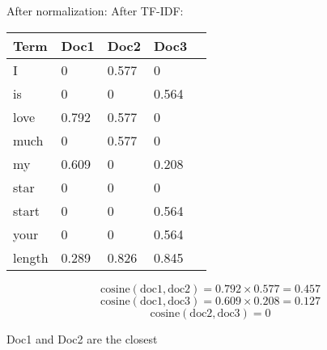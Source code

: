 \documentclass[11pt,a4paper]{report}
\begin{document}
\begin{multicols*}{2}
\noindent After normalization:
\noindent After TF-IDF:
\begin{center}
\begin{tabular}{ | l | l l l |l|} 
    \hline
    Term   & Doc1 & Doc2 & Doc3 \\
    \hline
    I      &0     &0.577 &0     \\
    is     &0     &0     &0.564 \\
    love   &0.792 &0.577 &0     \\
    much   &0     &0.577 &0     \\
    my     &0.609 &0     &0.208 \\
    star   &0     &0     &0     \\
    start  &0     &0     &0.564 \\
    your   &0     &0     &0.564 \\
    \hline
    length &0.289 &0.826 &0.845 \\
    \hline
\end{tabular}
\end{center}

$$\text{cosine}(\text{doc1},\text{doc2})=0.792 \times 0.577 = 0.457$$
$$\text{cosine}(\text{doc1},\text{doc3})=0.609 \times 0.208 = 0.127$$
$$\text{cosine}(\text{doc2},\text{doc3})=0$$

\noindent Doc1 and Doc2 are the closest

\end{multicols*}
\end{document}
